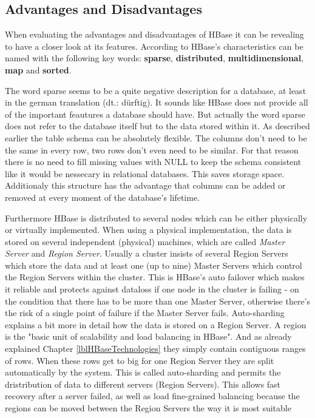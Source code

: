 
\subsection{Advantages and Disadvantages}
When evaluating the advantages and disadvantages of HBase it can be revealing to have a closer look at its features. According to \cite{hbase.achari.2015} HBase's characteristics can be named with the following key words: \textbf{sparse}, \textbf{distributed}, \textbf{multidimensional}, \textbf{map} and \textbf{sorted}. 

The word sparse seems to be a quite negative description for a database, at least in the german translation (dt.: dürftig). It sounds like HBase does not provide all of the important feautures a database should have. But actually the word sparse does not refer to the database itself but to the data stored within it. As described earlier the table schema can be absolutely flexible. The columns don't need to be the same in every row, two rows don't even need to be similar. For that reason there is no need to fill missing values with NULL to keep the schema consistent like it would be nessecary in relational databases. This saves storage space. Additionaly this structure has the advantage that columns can be added or removed at every moment of the database's lifetime. \cite{hbase.achari.2015}

Furthermore HBase is distributed to several nodes which can be either physically or virtually implemented. When using a physical implementation, the data is stored on several independent (physical) machines, \cite{hbase.wilson.2008} which are called \textit{Master Server} and \textit{Region Server}. Usually a cluster insists of several Region Servers which store the data \cite{hbase.vohra.2016} and at least one (up to nine) Master Servers which control the Region Servers within the cluster. \cite{hbase.apache.foundation.2017} This is HBase's auto failover which makes it reliable and protects against dataloss if one node in the cluster is failing \cite{hbase.wilson.2008} - on the condition that there has to be more than one Master Server, otherwise there’s the risk of a single point of failure if the Master Server fails. \cite{hbase.shriparv.2014}
Auto-sharding explains a bit more in detail how the data is stored on a Region Server. A region is the "basic unit of scalability and load balancing in HBase". And as already explained Chapter \ref{lblHBaseTechnologies} they simply contain contiguous ranges of rows. When these rows get to big for one Region Server they are split automatically by the system. This is called auto-sharding and permits the dristribution of data to different servers (Region Servers). This allows fast recovery after a server failed, as well as load fine-grained balancing because the regions can be moved between the Region Servers the way it is most suitable \cite{hbase.george.2011}


